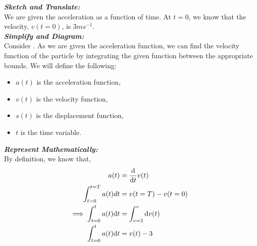 %
%
%


\begin{subquestions}
	
\subquestion

\begin{subsubquestions}
	
\subsubquestion

\textbf{\textit{Sketch and Translate:}} \\
We are given the acceleration as a function of time. At $t=0$, we know that the velocity, $v(t=0)$, is $3ms^{-1}$. \\
	
	
	
	
\textbf{\textit{Simplify and Diagram:}} \\
Consider . As we are given the acceleration function, we can find the velocity function of the particle by integrating the given function between the appropriate bounds.
We will define the following: 
\begin{itemize}
	\item $a(t)$ is the acceleration function,
	\item $v(t)$ is the velocity function,
	\item $s(t)$ is the displacement function,
	\item $t$ is the time variable.
\end{itemize}



\textbf{\textit{Represent Mathematically:}} \\
By definition, we know that,
\begin{align}
	a(t) & = \frac{\mathrm{d}}{\mathrm{d}t}v(t) \nonumber \\
	\int_{t=0}^{t=T} a(t) dt &= v(t=T) - v(t=0) \\
	\implies \int_{t=0}^{t}a(t)\mathrm{d} t & = \int_{v=3}^{v} \mathrm{d} v(t) \nonumber \\
	\int_{t=0}^{t}a(t)\mathrm{d} t & = v(t)-3 \label{2009:q6:VEqn1}
\end{align}





\end{subsubquestions}
\end{subquestions}
